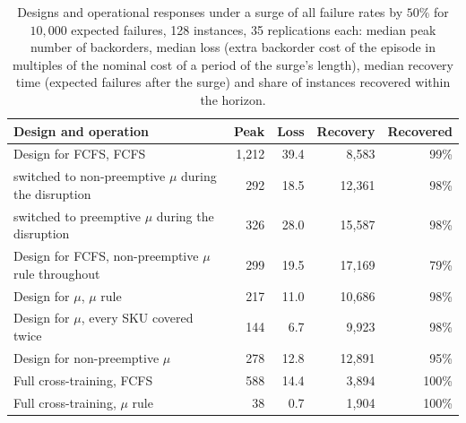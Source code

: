 \begin{table}[!htb]
\centering
\caption{Designs and operational responses under a surge of all failure rates by $50\%$ for $10{,}000$ expected failures, 128 instances, 35 replications each: median peak number of backorders, median loss (extra backorder cost of the episode in multiples of the nominal cost of a period of the surge's length), median recovery time (expected failures after the surge) and share of instances recovered within the horizon.}
\label{tab:surge_responses}
\small
\setlength{\tabcolsep}{4pt}
\begin{tabular}{@{}lrrrr@{}}
\toprule
Design and operation & Peak & Loss & Recovery & Recovered \\
\midrule
Design for FCFS, FCFS & 1,212 & 39.4 & 8,583 & 99\% \\
\quad switched to non-preemptive $\mu$ during the disruption & 292 & 18.5 & 12,361 & 98\% \\
\quad switched to preemptive $\mu$ during the disruption & 326 & 28.0 & 15,587 & 98\% \\
Design for FCFS, non-preemptive $\mu$ rule throughout & 299 & 19.5 & 17,169 & 79\% \\
Design for $\mu$, $\mu$ rule & 217 & 11.0 & 10,686 & 98\% \\
Design for $\mu$, every SKU covered twice & 144 & 6.7 & 9,923 & 98\% \\
Design for non-preemptive $\mu$ & 278 & 12.8 & 12,891 & 95\% \\
Full cross-training, FCFS & 588 & 14.4 & 3,894 & 100\% \\
Full cross-training, $\mu$ rule & 38 & 0.7 & 1,904 & 100\% \\
\bottomrule
\end{tabular}
\end{table}
